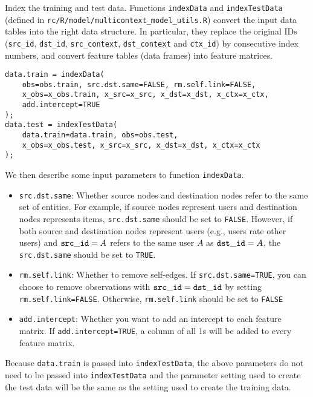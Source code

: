 \documentclass[10pt]{article}
\newcommand{\parahead}[1]{\vspace{0.15in}\noindent{\bf #1:}}
\begin{document}
\parahead{Step 2} Index the training and test data.  Functions {\tt indexData} and {\tt indexTestData} (defined in {\tt rc/R/model/multicontext\_model\_utils.R}) convert the input data tables into the right data structure.  In particular, they replace the original IDs ({\tt src\_id}, {\tt dst\_id}, {\tt src\_context}, {\tt dst\_context} and {\tt ctx\_id}) by consecutive index numbers, and convert feature tables (data frames) into feature matrices.
{\small\begin{verbatim}
data.train = indexData(
    obs=obs.train, src.dst.same=FALSE, rm.self.link=FALSE,
    x_obs=x_obs.train, x_src=x_src, x_dst=x_dst, x_ctx=x_ctx,
    add.intercept=TRUE
);
data.test = indexTestData(
    data.train=data.train, obs=obs.test,
    x_obs=x_obs.test, x_src=x_src, x_dst=x_dst, x_ctx=x_ctx
);
\end{verbatim}}
\noindent We then describe some input parameters to function {\tt indexData}.
\begin{itemize}
\item {\tt src.dst.same}: Whether source nodes and destination nodes refer to the same set of entities.  For example, if source nodes represent users and destination nodes represents items, {\tt src.dst.same} should be set to {\tt FALSE}.  However, if both source and destination nodes represent users (e.g., users rate other users) and ${\tt src\_id} = A$ refers to the same user $A$ as ${\tt dst\_id} = A$, the {\tt src.dst.same} should be set to {\tt TRUE}.
\item {\tt rm.self.link}: Whether to remove self-edges.  If {\tt src.dst.same=TRUE}, you can choose to remove observations with ${\tt src\_id} = {\tt dst\_id}$ by setting {\tt rm.self.link=FALSE}.  Otherwise, {\tt rm.self.link} should be set to {\tt FALSE}
\item {\tt add.intercept}: Whether you want to add an intercept to each feature matrix.  If {\tt add.intercept=TRUE}, a column of all 1s will be added to every feature matrix.
\end{itemize}
Because {\tt data.train} is passed into {\tt indexTestData}, the above parameters do not need to be passed into {\tt indexTestData} and the parameter setting used to create the test data will be the same as the setting used to create the training data.
\end{document}
